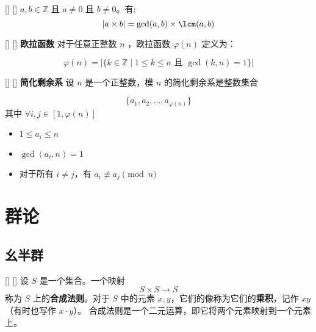 \documentclass[UTF8]{ctexart}
\begin{document}
            \begin{ppt}
            []
            {}
            []
            []
                $a, b \in \mathbb{Z}$ 且 $a \neq 0$ 且 $b \neq 0$。有:
                \[
                |a \times b| =\gcd(a,b) \times \lcm (a,b)
                \]
           \end{ppt}

            \begin{dfn}
            []
            {}
            []
            []
			\textbf{欧拉函数} 对于任意正整数  $ n $ ，欧拉函数  $ \varphi(n) $  定义为：

			\[
			\varphi(n) = \left| \{ k \in \mathbb{Z} \mid 1 \leq k \leq n \text{ 且 } \gcd(k, n) = 1 \} \right|
			\]
			
		\end{dfn}

            \begin{dfn}
            []
            {}
            []
            []
			\textbf{简化剩余系} 设  $ n $  是一个正整数，模  $ n $  的简化剩余系是整数集合

			
			\[
				\{a_1, a_2, \ldots, a_{\varphi(n)}\}
				\]
				其中  $\forall i,j\in [1,\varphi(n)]$
				\begin{itemize}
					\item $1 \leq a_i \leq n$
					\item $\gcd(a_i, n) = 1$
					\item 对于所有 $i \neq j$，有 $a_i \not\equiv a_j \pmod{n}$
				\end{itemize}

		\end{dfn}




\section{群论}
	
	

	\subsection{幺半群}

		\begin{dfn}
            []
            {}
            []
            []
			设 \( S \) 是一个集合。一个映射
		\[
		S \times S \rightarrow S
		\]
		称为 \( S \) 上的\textbf{合成法则}。对于 \( S \) 中的元素 \( x, y \)，它们的像称为它们的\textbf{乘积}，记作 \( xy \)（有时也写作 \( x \cdot y \)）。
		合成法则是一个二元运算，即它将两个元素映射到一个元素上。
		\end{dfn}
\end{document}
